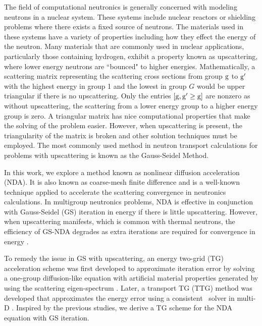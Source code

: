 
The field of computational neutronics is generally concerned with modeling neutrons in a nuclear system. These systems include nuclear reactors or shielding problems where there exists a fixed source of neutrons. The materials used in these systems have a variety of properties including how they effect the energy of the neutron. Many materials that are commonly used in nuclear applications, particularly those containing hydrogen, exhibit a property known as upscattering, where lower energy neutrons are ``bounced" to higher energies. Mathematically, a scattering matrix representing the scattering cross sections from group $\mathrm{g}$ to $\mathrm{g}'$ with the highest energy in group 1 and the lowest in group $G$ would be upper triangular if there is no upscattering. Only the entries $[\mathrm{g}, \mathrm{g}'\geq \mathrm{g}]$ are nonzero as without upscattering, the scattering from a lower energy group to a higher energy group is zero. A triangular matrix has nice computational properties that make the solving of the problem easier. However, when upscattering is present, the triangularity of the matrix is broken and other solution techniques must be employed. The most commonly used method in neutron transport calculations for problems with upscattering is known as the Gauss-Seidel Method. 

In this work, we explore a method known as nonlinear diffusion acceleration (NDA). It is also known as coarse-mesh finite difference and is a well-known technique applied to accelerate the scattering convergence in neutronics calculations. In multigroup neutronics problems, NDA is effective in conjunction with Gauss-Seidel (GS) iteration in energy if there is little upscattering. However, when upscattering manifests, which is common with thermal neutrons, the efficiency of GS-NDA degrades as extra iterations are required for convergence in energy \cite{park-nda}.

To remedy the issue in GS with upscattering, an energy two-grid (TG) acceleration scheme was first developed to approximate iteration error by solving a one-group diffusion-like equation with artificial material properties generated by using the scattering eigen-spectrum \cite{morel-upscat}. Later, a transport TG (TTG) method was developed that approximates the energy error using a consistent \sn\ solver in multi-D \cite{evans-upscat}. Inspired by the previous studies, we derive a TG scheme for the NDA equation with GS iteration.

